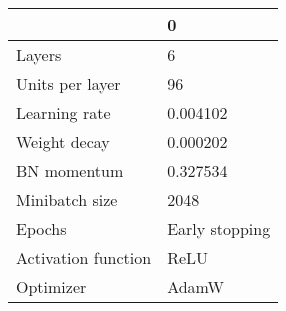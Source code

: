 \begin{tabular}{ll}
\toprule
 & 0 \\
\midrule
Layers & 6 \\
Units per layer & 96 \\
Learning rate & 0.004102 \\
Weight decay & 0.000202 \\
BN momentum & 0.327534 \\
Minibatch size & 2048 \\
Epochs & Early stopping \\
Activation function & ReLU \\
Optimizer & AdamW \\
\bottomrule
\end{tabular}
